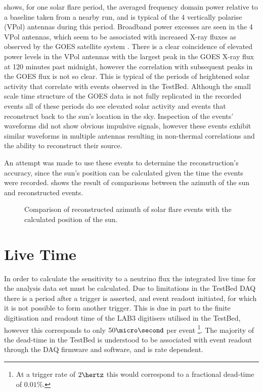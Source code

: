  shows, for one solar flare period, the averaged frequency domain power relative to a baseline taken from a nearby run, and is typical of the 4 vertically polarise (VPol) antennas during this period. Broadband power excesses are seen in the 4 VPol antennas, which seem to be associated with increased X-ray fluxes as observed by the GOES satellite system \cite{2009SPIE.7438E...1C}. There is a clear coincidence of elevated power levels in the VPol antennas with the largest peak in the GOES X-ray flux at 120 minutes past midnight, however the correlation with subsequent peaks in the GOES flux is not so clear. This is typical of the periods of heightened solar activity that correlate with events observed in the TestBed. Although the small scale time structure of the GOES data is not fully replicated in the recorded events all of these periods do see elevated solar activity and events that reconstruct back to the sun's location in the sky. Inspection of the events' waveforms did not show obvious impulsive signals, however these events exhibit similar waveforms in multiple antennas resulting in non-thermal correlations and the ability to reconstruct their source. 

An attempt was made to use these events to determine the reconstruction's accuracy, since the sun's position can be calculated given the time the events were recorded.  shows the result of comparisons between the azimuth of the sun and reconstructed events. 

\begin{figure}
  \hfill
  \caption{Comparison of reconstructed azimuth of solar flare events with the calculated position of the sun.}
  \label{fig:Results:Solar-Flare:Phi}
\end{figure}

\section{Live Time}
\label{sec:Results:Live-Time}

In order to calculate the sensitivity to a neutrino flux the integrated live time for the analysis data set must be calculated. Due to limitations in the TestBed DAQ there is a period after a trigger is asserted, and event readout initiated, for which it is not possible to form another trigger. This is due in part to the finite digitisation and readout time of the LAB3 digitisers utilised in the TestBed, however this corresponds to only $50 \micro \second$ per event \footnote{At a trigger rate of $2 \hertz$ this would correspond to a fractional dead-time of $0.01 \%$.}. The majority of the dead-time in the TestBed is understood to be associated with event readout through the DAQ firmware and software, and is rate dependent.

